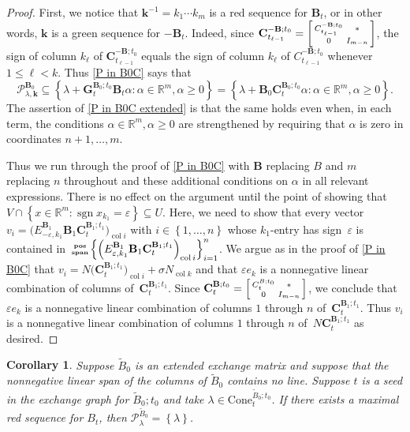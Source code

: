 \documentclass{amsart}
\newtheorem{corollary}[proposition]{Corollary}
\theoremstyle{definition}
\theoremstyle{remark}
\numberwithin{equation}{section}
\newcommand{\reals}{\mathbb R}
\newcommand{\ep}{\varepsilon}
\newcommand{\col}{\operatorname{col}}
\newcommand{\sgn}{\operatorname{sgn}}
\newcommand{\posspan}{\!\!\tiny\begin{array}{c}\mathbf{pos}\\\mathbf{span}\end{array}\!\!}
\newcommand{\set}[1]{{\left\lbrace #1 \right\rbrace}}
\newcommand{\GG}{{\mathbf G}}
\newcommand{\CC}{{\mathbf C}}
\newcommand{\0}{{\mathbf{0}}}
\newcommand{\Cone}{\mathrm{Cone}}
\newcommand{\kk}{\mathbf{k}}
\newcommand{\tB}{{\tilde{B}}}
\newcommand{\BB}{\mathbf{B}}
\renewcommand{\P}{\mathcal{P}}
\begin{document}
\begin{proof}
First, we notice that $\kk^{-1}=k_1\cdots k_m$ is a red sequence for $\BB_t$, or in other words, $\kk$ is a green sequence for $-\BB_t$.
Indeed, since $\CC_{t_{\ell-1}}^{-\BB;t_0}=\begin{bsmallmatrix}C_{t_{\ell-1}}^{-\BB;t_0}&*\\0&I_{m-n}\end{bsmallmatrix}$, the sign of column $k_\ell$ of $\CC_{t_{\ell-1}}^{-\BB;t_0}$ equals the sign of column $k_\ell$ of $C_{t_{\ell-1}}^{-\BB;t_0}$ whenever $1\le\ell<k$.
Thus \cref{P in B0C} says that
\[\P^{\BB_0}_{\lambda,\kk}\subseteq\set{\lambda+\GG_t^{\BB_0;t_0}\BB_t\alpha:\alpha\in\reals^m,\alpha\ge0}=\set{\lambda+\BB_0\CC_t^{\BB_0;t_0}\alpha:\alpha\in\reals^m,\alpha\ge0}.\]
The assertion of \cref{P in B0C extended} is that the same holds even when, in each term, the conditions $\alpha\in\reals^m,\alpha\ge0$ are strengthened by requiring that $\alpha$ is zero in coordinates $n+1,\ldots,m$.

Thus we run through the proof of \cref{P in B0C} with $\BB$ replacing $B$ and $m$ replacing $n$ throughout and these additional conditions on $\alpha$ in all relevant expressions.
There is no effect on the argument until the point of showing that $V\cap\set{x\in\reals^m:\sgn x_{k_1}=\ep}\subseteq U$.
Here, we need to show that every vector $v_i=\bigl(E^{\BB_1}_{-\ep,k_1}\BB_1\CC_t^{\BB_1;t_1}\bigr)_{\col i}$ with $i\in\set{1,\ldots,n}$ whose $k_1$-entry has sign~$\ep$ is contained in $\posspan\set{\left(E^{\BB_1}_{\ep,k_1}\BB_1\CC_t^{\BB_1;t_1}\right)_{\col i}}_{i=1}^n$.
We argue as in the proof of \cref{P in B0C} that $v_i=N\bigl(\CC_t^{\BB_1;t_1}\bigr)_{\col i}+\sigma N_{\col k}$ and that $\ep e_k$ is a nonnegative linear combination of columns of~$\CC_t^{\BB_1;t_1}$.
Since $\CC_t^{\BB;t_0}=\begin{bsmallmatrix}C_t^{B;t_0}&*\\0&I_{m-n}\end{bsmallmatrix}$, we conclude that $\ep e_k$ is a nonnegative linear combination of columns $1$ through $n$ of~$\CC_t^{\BB_1;t_1}$.
Thus $v_i$ is a nonnegative linear combination of columns $1$ through $n$ of~$N\CC_t^{\BB_1;t_1}$ as desired.
\end{proof}

\begin{corollary}\label{P point}  
Suppose $\tB_0$ is an extended exchange matrix and suppose that the nonnegative linear span of the columns of $\tB_0$ contains no line.
Suppose $t$ is a seed in the exchange graph for $\tB_0;t_0$ and take $\lambda\in\Cone^{\tB_0;t_0}_t$.
If there exists a maximal red sequence for $B_t$, then $\P^{\tB_0}_\lambda=\set{\lambda}$.
\end{corollary}
\end{document}
